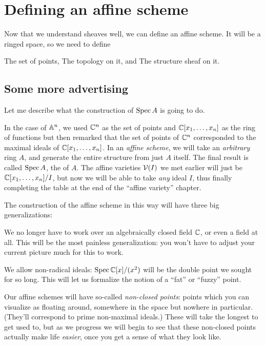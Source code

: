 \chapter{Defining an affine scheme}
Now that we understand sheaves well,
we can define an affine scheme.
It will be a ringed space, so we need to define
\begin{itemize}
	\ii The set of points,
	\ii The topology on it, and
	\ii The structure sheaf on it.
\end{itemize}

\section{Some more advertising}
Let me describe what the construction of $\operatorname{Spec} A$ is going to do.

In the case of $\mathbb A^n$, we used $\mathbb C^n$ as the set of points
and $\mathbb C[x_1, \dots, x_n]$ as the ring of functions
but then remarked that the set of points
of $\mathbb C^n$ corresponded to the maximal ideals of $\mathbb C[x_1, \dots, x_n]$.
In an \emph{affine scheme}, we will take an \emph{arbitrary} ring $A$,
and generate the entire structure from just $A$ itself.
The final result is called $\operatorname{Spec} A$, the  of $A$.
The affine varieties $\mathcal V(I)$ we met earlier will just be
$\mathbb C[x_1, \dots, x_n] / I$, but now we will be able to take
\emph{any} ideal $I$, thus finally completing the table at the end
of the ``affine variety'' chapter.

The construction of the affine scheme in this way
will have three big generalizations:
\begin{enumerate}
	\ii We no longer have to work over an algebraically
	closed field $\mathbb C$, or even a field at all.
	This will be the most painless generalization:
	you won't have to adjust your current picture much for this to work.

	\ii We allow non-radical ideals:
	$\operatorname{Spec} \mathbb C[x] / (x^2)$ will be the double point
	we sought for so long.
	This will let us formalize the notion of a ``fat'' or ``fuzzy'' point.

	\ii Our affine schemes will have so-called \emph{non-closed points}:
	points which you can visualize as floating around,
	somewhere in the space but nowhere in particular.
	(They'll correspond to prime non-maximal ideals.)
	These will take the longest to get used to,
	but as we progress we will begin to see that these non-closed points
	actually make life \emph{easier},
	once you get a sense of what they look like.
\end{enumerate}

